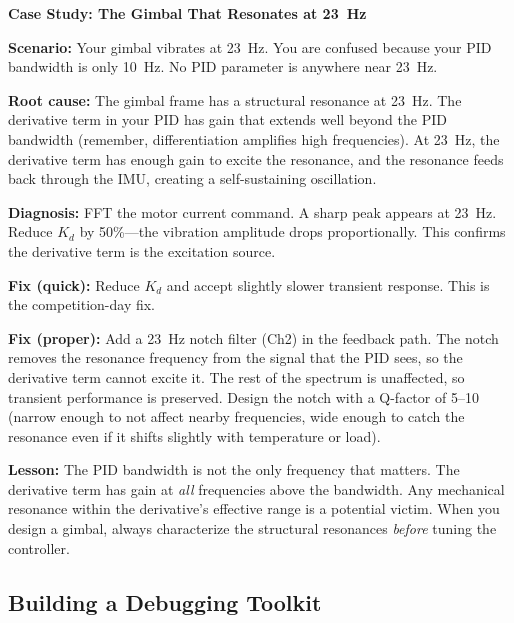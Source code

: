 \begin{mdframed}[linewidth=1pt, innertopmargin=10pt, innerbottommargin=10pt]
\textbf{Case Study: The Gimbal That Resonates at 23~Hz}

\vspace{0.3em}
\textbf{Scenario:} Your gimbal vibrates at 23~Hz. You are confused because your PID bandwidth is only 10~Hz. No PID parameter is anywhere near 23~Hz.

\textbf{Root cause:} The gimbal frame has a structural resonance at 23~Hz. The derivative term in your PID has gain that extends well beyond the PID bandwidth (remember, differentiation amplifies high frequencies). At 23~Hz, the derivative term has enough gain to excite the resonance, and the resonance feeds back through the IMU, creating a self-sustaining oscillation.

\textbf{Diagnosis:} FFT the motor current command. A sharp peak appears at 23~Hz. Reduce $K_d$ by 50\%---the vibration amplitude drops proportionally. This confirms the derivative term is the excitation source.

\textbf{Fix (quick):} Reduce $K_d$ and accept slightly slower transient response. This is the competition-day fix.

\textbf{Fix (proper):} Add a 23~Hz notch filter (Ch2) in the feedback path. The notch removes the resonance frequency from the signal that the PID sees, so the derivative term cannot excite it. The rest of the spectrum is unaffected, so transient performance is preserved. Design the notch with a Q-factor of 5--10 (narrow enough to not affect nearby frequencies, wide enough to catch the resonance even if it shifts slightly with temperature or load).

\textbf{Lesson:} The PID bandwidth is not the only frequency that matters. The derivative term has gain at \textit{all} frequencies above the bandwidth. Any mechanical resonance within the derivative's effective range is a potential victim. When you design a gimbal, always characterize the structural resonances \textit{before} tuning the controller.
\end{mdframed}

\vspace{1em}

\subsection{Building a Debugging Toolkit}

